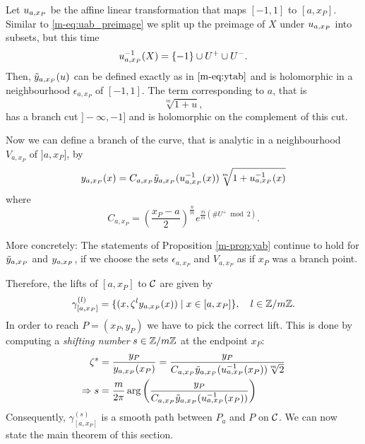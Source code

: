\documentclass[main.tex]{subfiles}
\begin{document}
  Let  $u_{a,x_P}$ be the affine linear transformation
  that maps $[-1,1]$ to $[a,x_P]$. Similar to \eqref{m-eq:uab_preimage} we split up the preimage of $X$ under $u_{a,x_P}$ into subsets, but this time
 \begin{equation}
  u_{a,x_P}^{-1}(X) = \{-1\} \cup U^+ \cup U^-.
 \end{equation}
  Then, $\tilde{y}_{a,x_P}(u)$ can be defined exactly as in $\eqref{m-eq:ytab}$ and
  is holomorphic in a neighbourhood $\epsilon_{a,x_P}$ of $[-1,1]$.
  The term corresponding to $a$, that is
  \begin{equation}
   \sqrt[m]{1+u},
  \end{equation}
   has a branch cut $]-\infty,-1]$ and is holomorphic on the complement of this cut.
   
  Now we can define a branch of the curve,
   that is analytic in a neighbourhood $V_{a,x_P}$ of $]a,x_P]$, by
  \begin{equation}
    y_{a,x_P}(x) =   C_{a,x_P} \tilde{y}_{a,x_P}( u_{a,x_P}^{-1}(x) ) \sqrt[m]{1 + u_{a,x_P}^{-1}(x)}
  \end{equation}
  where 
   \begin{equation}
      C_{a,x_P} = \left(\frac{x_P-a}{2}\right)^{\frac{n}{m}} e^{\frac{\pi i}{m}(\#U^+ \bmod 2)}.
  \end{equation}
  
  More concretely: The statements of Proposition \ref{m-prop:yab} continue to hold for $\tilde{y}_{a,x_P}$ and $y_{a,x_P}$, 
  if we choose the sets $\epsilon_{a,x_P}$ and $V_{a,x_P}$ as if $x_P$ was a branch point.
  
  Therefore, the lifts of $[a,x_P]$ to $\mathcal{C}$ are given by
    \begin{equation}\label{eq:def_path_axp}
      \gamma^{(l)}_{[a,x_P]} = \{  (x,\zeta^l y_{a,x_P}(x))  \mid  x \in [a,x_P]  \}, \quad l \in \mathbb{Z}/m\mathbb{Z}.
   \end{equation}
  In order to reach $P = (x_P,y_P)$ we have to pick the correct lift. This is done by computing a \emph{shifting number} $s \in \mathbb{Z}/m\mathbb{Z}$ at the endpoint $x_P$:
  \begin{align}
   \zeta^s & = \frac{y_P}{y_{a,x_P}(x_P)} = \frac{y_P}{ C_{a,x_P} \tilde{y}_{a,x_P}( u_{a,x_P}^{-1}(x_P) ) \sqrt[m]{2}  } \\
   \Rightarrow s & = \frac{m}{2\pi} \arg\left(  \frac{y_P}{C_{a,x_P} \tilde{y}_{a,x_P}( u_{a,x_P}^{-1}(x_P) )} \right)
  \end{align}
  Consequently, $\gamma^{(s)}_{[a,x_P]}$ is a smooth path between $P_a$ and $P$ on $\mathcal{C}$. We can now state the main theorem of this section.
  
\end{document}
